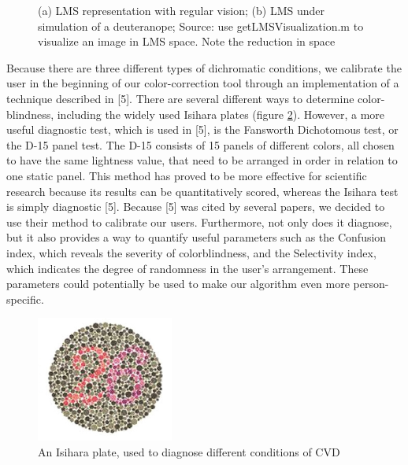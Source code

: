 \documentclass[10pt,twocolumn,letterpaper]{article}
\begin{document}
\begin{figure}[h]
\begin{subfigure}{0.22\textwidth}
    \caption{}
  \end{subfigure}
  \caption{(a) LMS representation with regular vision; (b) LMS under simulation of a deuteranope; Source: use getLMSVisualization.m to visualize an image in LMS space. Note the reduction in space}
  \label{fig:gamut}
\end{figure}

	Because there are three different types of dichromatic conditions, we calibrate the user in the beginning of our color-correction tool through an implementation of a technique described in [5]. There are several different ways to determine color-blindness, including the widely used Isihara plates (figure \ref{fig:plate}). However, a more useful diagnostic test, which is used in [5], is the Fansworth Dichotomous test, or the D-15 panel test. The D-15 consists of 15 panels of different colors, all chosen to have the same lightness value, that need to be arranged in order in relation to one static panel. This method has proved to be more effective for scientific research because its results can be quantitatively scored, whereas the Isihara test is simply diagnostic [5]. Because [5] was cited by several papers, we decided to use their method to calibrate our users. Furthermore, not only does it diagnose, but it also provides a way to quantify useful parameters such as the Confusion index, which reveals the severity of colorblindness, and the Selectivity index, which indicates the degree of randomness in the user’s arrangement. These parameters could potentially be used to make our algorithm even more person-specific. 

\begin{figure}[h]
  \includegraphics[width=0.4\textwidth]{plate.png}
  \caption{An Isihara plate, used to diagnose different conditions of CVD}
  \label{fig:plate}
\end{figure}
\end{document}
